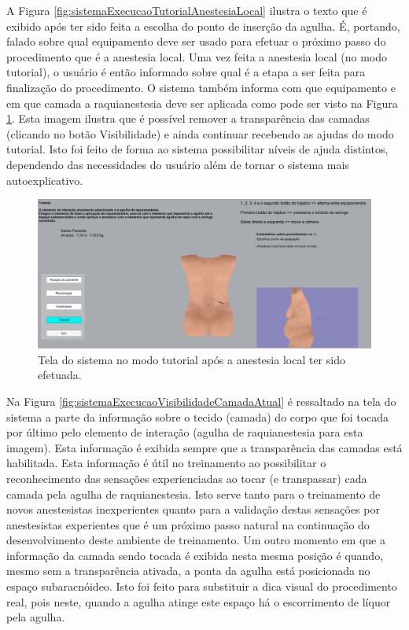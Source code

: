 A Figura \ref{fig:sistemaExecucaoTutorialAnestesiaLocal} ilustra o texto que é exibido após ter sido feita a escolha do ponto de inserção da agulha. É, portando, falado sobre qual equipamento deve ser usado para efetuar o próximo passo do procedimento que é a anestesia local. Uma vez feita a anestesia local (no modo tutorial), o usuário é então informado sobre qual é a etapa a ser feita para finalização do procedimento. O sistema também informa com que equipamento e em que camada a raquianestesia deve ser aplicada como pode ser visto na Figura \ref{fig:sistemaExecucaoTutorialRaqui}. Esta imagem ilustra que é possível remover a transparência das camadas (clicando no botão Visibilidade) e ainda continuar recebendo as ajudas do modo tutorial. Isto foi feito de forma ao sistema possibilitar níveis de ajuda distintos, dependendo das necessidades do usuário além de tornar o sistema mais autoexplicativo. 

\begin{figure}[ht!]
    \centering
    \includegraphics[width=\textwidth]{capitulos/figuras/sistemaExecucaoTutorialRaqui.png} 
    \caption{Tela do sistema no modo tutorial após a anestesia local ter sido efetuada.}
    \label{fig:sistemaExecucaoTutorialRaqui}
\end{figure}

Na Figura \ref{fig:sistemaExecucaoVisibilidadeCamadaAtual} é ressaltado na tela do sistema a parte da informação sobre o tecido (camada) do corpo que foi tocada por último pelo elemento de interação (agulha de raquianestesia para esta imagem). Esta informação é exibida sempre que a transparência das camadas está habilitada. Esta informação é útil no treinamento ao possibilitar o reconhecimento das sensações experienciadas ao tocar (e transpassar) cada camada pela agulha de raquianestesia. Isto serve tanto para o treinamento de novos anestesistas inexperientes quanto para a validação destas sensações por anestesistas experientes que é um próximo passo natural na continuação do desenvolvimento deste ambiente de treinamento. Um outro momento em que a informação da camada sendo tocada é exibida nesta mesma posição é quando, mesmo sem a transparência ativada, a ponta da agulha está posicionada no espaço subaracnóideo. Isto foi feito para substituir a dica visual do procedimento real, pois neste, quando a agulha atinge este espaço há o escorrimento de líquor pela agulha.  

